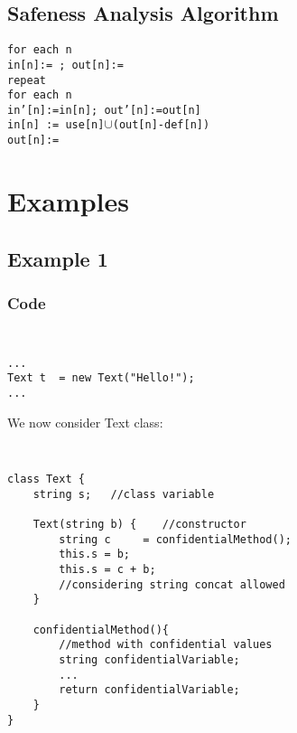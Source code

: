 \documentclass[letterpaper,twocolumn,10pt]{article}
\begin{document}
\subsection{Safeness Analysis Algorithm}

\texttt{for each n \\
    in[n]:={ }; out[n]:={ } \\
repeat \\
    for each n \\
    in’[n]:=in[n]; out’[n]:=out[n] \\
        in[n] := use[n]}$\cup$\texttt{(out[n]-def[n])\\
        out[n]:=}
        
        




\section{Examples}
\paragraph{}

\subsection{Example 1}
\subsubsection{Code}
{\tt \small
\begin{verbatim}
...
Text t	= new Text("Hello!");
...
\end{verbatim}
}
We now consider Text class: \\
{\tt \small
\begin{verbatim}
class Text {
    string s;	//class variable
	
    Text(string b) { 	//constructor
        string c	 = confidentialMethod();
        this.s = b;
        this.s = c + b;
        //considering string concat allowed
    }
	
    confidentialMethod(){ 
        //method with confidential values
        string confidentialVariable;		
        ...
        return confidentialVariable;
    }
}
\end{verbatim}
}
\end{document}
